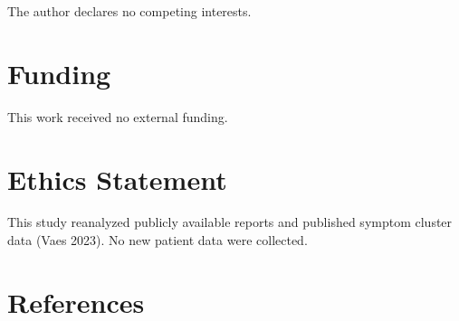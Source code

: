\documentclass[
  letterpaper,
  DIV=11,
  numbers=noendperiod]{scrartcl}
\begin{document}
The author declares no competing interests.

\section*{Funding}\label{funding}

This work received no external funding.

\section*{Ethics Statement}\label{ethics-statement}

This study reanalyzed publicly available reports and published symptom
cluster data (Vaes 2023). No new patient data were collected.

\newpage{}

\section*{References}\label{references}
\end{document}
